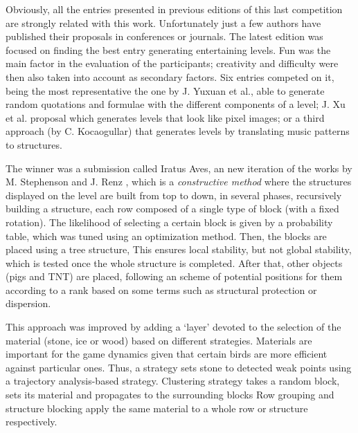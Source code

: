 \documentclass[runningheads,a4paper]{llncs}
\begin{document}
Obviously, all the entries presented in previous editions of this last
competition are strongly related with this
work. Unfortunately just a few  authors have published their
proposals in conferences or journals. The latest edition
 \cite{AngryBirds_LevelGeneration_18} was focused on finding the best 
entry generating entertaining levels. Fun was the main factor in the
evaluation of the participants;  creativity and difficulty were then
also taken into account as secondary factors. 
Six entries competed on it, being the most representative the one by
J. Yuxuan et al., able to generate random quotations and formulae with
the different components of a level; J. Xu et al. proposal which
generates levels that look like pixel images; or a third approach (by
C. Kocaogullar) that generates levels by translating music patterns to
structures. %

The winner was a submission called Iratus Aves, an new iteration of
the works by M. Stephenson and J. Renz
 \cite{stephenson2017generating,stephenson2016procedural}, which is a
\textit{constructive method} where the structures displayed on the
level are built from top to down, in several phases, recursively
building a structure, each row composed of a single type of block
(with a fixed rotation). The likelihood of selecting a certain block
is given by a probability table, which was tuned using an optimization
method. Then, the blocks are placed using a tree structure,
This ensures local stability, but not global stability, which
is tested once the whole structure is completed.  
After that, other objects (pigs and TNT) are placed, following an
scheme of potential positions for them according to a rank based on
some terms such as structural protection or dispersion. 

This approach was improved by adding a `layer' devoted to the
selection of the material (stone, ice or wood) based on different
strategies. Materials are important for the game dynamics given that certain birds are more
efficient against particular ones.
Thus, a strategy sets stone to detected weak
points using a trajectory analysis-based strategy.
Clustering strategy takes a random block, sets its material and
propagates to the surrounding blocks
Row grouping and structure blocking apply the same material to a
whole row or structure respectively. 
\end{document}
